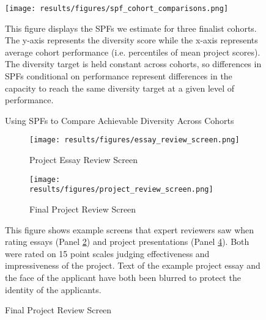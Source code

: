     \newpage
    \begin{figure}[!htb]
    \centering
        \caption{Using SPFs to Compare Achievable Diversity Across Cohorts}\label{fig:diversity_across_cohorts}
      \texttt{[image: results/figures/spf\_cohort\_comparisons.png]} 
        \begin{notes}
        This figure displays the SPFs we estimate for three finalist cohorts. The y-axis represents the diversity score while the x-axis represents average cohort performance (i.e. percentiles of mean project scores). The diversity target is held constant across cohorts, so differences in SPFs conditional on performance represent differences in the capacity to reach the same diversity target at a given level of performance. 
        \end{notes}
    \end{figure}
    
    \newpage
    \newpage
    \begin{figure}[!htb]
        \centering
        \caption{Expert Review Screens}
        \begin{subfigure}[]{\textwidth}
            \centering
                    \caption{Project Essay Review Screen} \label{subfig:essay}
            \texttt{[image: results/figures/essay\_review\_screen.png]} 
        \end{subfigure}
        \hline
        \hfill
        \vspace{1em}
        \begin{subfigure}[]{\textwidth}
            \centering
                    \caption{Final Project Review Screen} \label{subfig:project}
            \texttt{[image: results/figures/project\_review\_screen.png]} 
        \end{subfigure}
        \hline
        \begin{notes}
        This figure shows example screens that expert reviewers saw when rating essays (Panel \ref{subfig:essay}) and project presentations (Panel \ref{subfig:project}). Both were rated on 15 point scales judging effectiveness and impressiveness of the project. Text of the example project essay and the face of the applicant have both been blurred to protect the identity of the applicants. 
        \end{notes}
    \end{figure}
    
